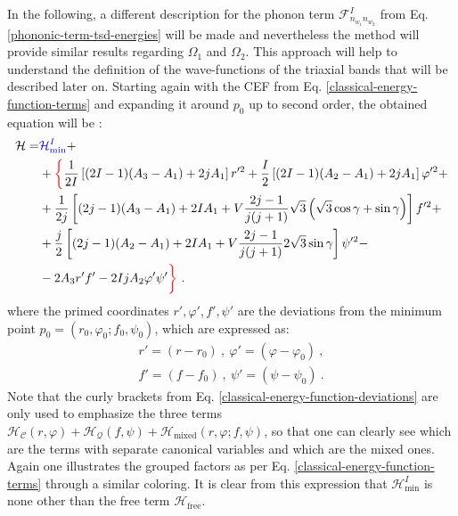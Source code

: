In the following, a different description for the phonon term $\mathcal{F}_{n_{w_1}n_{w_2}}^I$ from Eq. \ref{phononic-term-tsd-energies} will be made and nevertheless the method will provide similar results regarding $\Omega_1$ and $\Omega_2$. This approach will help to understand the definition of the wave-functions of the triaxial bands that will be described later on. Starting again with the CEF from Eq. \ref{classical-energy-function-terms} and expanding it around $p_0$ up to second order, the obtained equation will be \cite{raduta2020approach}:
\begin{align}
    \mathcal{H}=&{\color{blue}\mathcal{H}_\text{min}^I}+\nonumber\\
                &+{\color{red}\bigg\{}\frac{1}{2I}\left[(2I-1)(A_3-A_1)+2jA_1\right]r'^{2}+\frac{I}{2}\left[(2I-1)(A_2-A_1)+2jA_1\right]\varphi'^2+\nonumber\\
                &+\frac{1}{2j}\left[(2j-1)(A_3-A_1)+2IA_1+V\frac{2j-1}{j(j+1)}\sqrt{3}\left(\sqrt{3}\cos\gamma+\sin\gamma\right)\right]f'^2+\nonumber\\
                &+\frac{j}{2}\left[(2j-1)(A_2-A_1)+2IA_1+V\frac{2j-1}{j(j+1)}2\sqrt{3}\sin\gamma\right]\psi'^2-\nonumber\\
                &-2A_3r'f'-2IjA_2\varphi'\psi'{\color{red}\bigg\}}\ .
    \label{classical-energy-function-deviations}
\end{align}
where the primed coordinates $r',\varphi',f',\psi'$ are the deviations from the minimum point $p_0=(r_0,\varphi_0;f_0,\psi_0)$, which are expressed as:
\begin{align}
    r'=(r-r_0)\ ,\ \varphi'=(\varphi-\varphi_0)\ ,\nonumber\\
    f'=(f-f_0)\ ,\ \psi'=(\psi-\psi_0)\ .
\end{align}
Note that the curly brackets from Eq. \ref{classical-energy-function-deviations} are only used to emphasize the three terms $\mathcal{H}_\mathscr{C}(r,\varphi)+\mathcal{H}_\mathcal{Q}(f,\psi)+\mathcal{H}_\text{mixed}(r,\varphi;f,\psi)$, so that one can clearly see which are the terms with separate canonical variables and which are the mixed ones. Again one illustrates the grouped factors as per Eq. \ref{classical-energy-function-terms} through a similar coloring. It is clear from this expression that $\mathcal{H}_\text{min}^I$ is none other than the free term $\mathcal{H}_\text{free}$.

